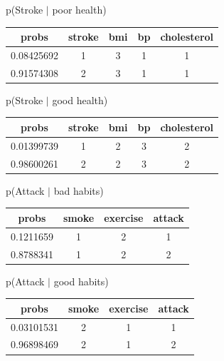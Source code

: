 \documentclass[11pt]{article}
\begin{document}
p(Stroke $|$ poor health)

\begin{table}[!hbt]
\begin{center}
\begin{tabular}{ |c|c|c|c|c| }
  \hline
  probs & stroke & bmi & bp & cholesterol \\
  \hline
  0.08425692 & 1 & 3 & 1 & 1\\
  \hline
  0.91574308 & 2 & 3 & 1 & 1 \\
  \hline
\end{tabular}
\end{center}
\end{table}

p(Stroke $|$ good health)

\begin{table}[!hbt]
\begin{center}
\begin{tabular}{ |c|c|c|c|c| }
  \hline
  probs & stroke & bmi & bp & cholesterol \\
  \hline
  0.01399739 & 1 & 2 & 3 & 2\\
  \hline
 0.98600261 & 2 & 2 & 3 & 2 \\
  \hline
\end{tabular}
\end{center}
\end{table}
\vspace{-20pt}

p(Attack $|$ bad habits)

\begin{table}[!hbt]
\begin{center}
\begin{tabular}{ |c|c|c|c| }
  \hline
  probs & smoke & exercise & attack \\
  \hline
  0.1211659 & 1 & 2 & 1 \\
  \hline
  0.8788341 & 1 & 2 & 2 \\
  \hline
\end{tabular}
\end{center}
\end{table}
\vspace{-20pt}

p(Attack $|$ good habits)

\begin{table}[!hbt]
\begin{center}
\begin{tabular}{ |c|c|c|c| }
  \hline
  probs & smoke & exercise & attack \\
  \hline
  0.03101531 & 2 & 1 & 1 \\
  \hline
 0.96898469 & 2 & 1 & 2 \\
  \hline
\end{tabular}
\end{center}
\end{table}
\vspace{-20pt}
\end{document}
